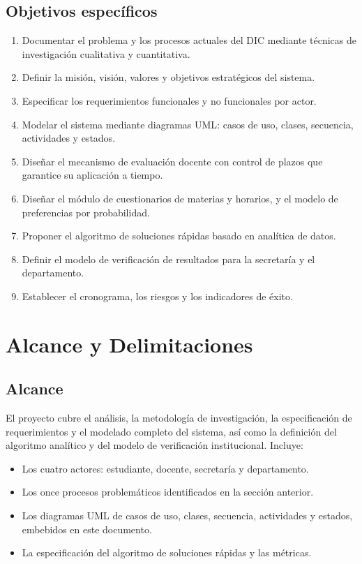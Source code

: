 \subsection{Objetivos específicos}
\begin{enumerate}[leftmargin=1.4cm, itemsep=4pt]
  \item Documentar el problema y los procesos actuales del \ac{DIC} mediante
        técnicas de investigación cualitativa y cuantitativa.
  \item Definir la misión, visión, valores y objetivos estratégicos del sistema.
  \item Especificar los requerimientos funcionales y no funcionales por actor.
  \item Modelar el sistema mediante diagramas \ac{UML}: casos de uso, clases,
        secuencia, actividades y estados.
  \item Diseñar el mecanismo de evaluación docente con control de plazos que
        garantice su aplicación a tiempo.
  \item Diseñar el módulo de cuestionarios de materias y horarios, y el modelo de
        preferencias por probabilidad.
  \item Proponer el algoritmo de soluciones rápidas basado en analítica de datos.
  \item Definir el modelo de verificación de resultados para la secretaría y el
        departamento.
  \item Establecer el cronograma, los riesgos y los indicadores de éxito.
\end{enumerate}

\section{Alcance y Delimitaciones}

\subsection{Alcance}
El proyecto cubre el análisis, la metodología de investigación, la especificación
de requerimientos y el modelado completo del sistema, así como la definición del
algoritmo analítico y del modelo de verificación institucional. Incluye:

\begin{itemize}[leftmargin=1.4cm, itemsep=3pt]
  \item Los cuatro actores: estudiante, docente, secretaría y departamento.
  \item Los once procesos problemáticos identificados en la sección anterior.
  \item Los diagramas \ac{UML} de casos de uso, clases, secuencia, actividades y
        estados, embebidos en este documento.
  \item La especificación del algoritmo de soluciones rápidas y las métricas.
\end{itemize}

